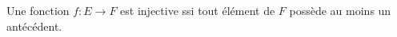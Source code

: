 Une fonction $f : E\to F$ est injective ssi tout élément de $F$ possède au moins un antécédent.

\begin{reponses}
\end{reponses}

